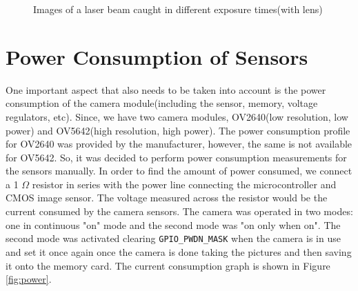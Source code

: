\begin{figure}[ht]
\begin{subfigure}{0.5\textwidth}
    \end{subfigure}    
    \caption{Images of a laser beam caught in different exposure times(with lens)}
    \label{fig:exptests}
    \end{figure}
    
\section{Power Consumption of Sensors}
 One important aspect that also needs to be taken into account is the power consumption of the camera module(including the sensor, memory, voltage regulators, etc). Since, we have two camera modules, OV2640(low resolution, low power) and OV5642(high resolution, high power). The power consumption profile for OV2640 was provided by the manufacturer, however, the same is not available for OV5642. So, it was decided to perform power consumption measurements for the sensors manually. In order to find the amount of power consumed, we connect a 1 $\Omega$ resistor in series with the power line connecting the microcontroller and CMOS image sensor. The voltage measured across the resistor would be the current consumed by the camera sensors. The camera was operated in two modes: one in continuous "on" mode and the second mode was "on only when on". The second mode was activated clearing \texttt{GPIO\_PWDN\_MASK} when the camera is in use and set it once again once the camera is done taking the pictures and then saving it onto the memory card. The current consumption graph is shown in Figure \ref{fig:power}.
 
